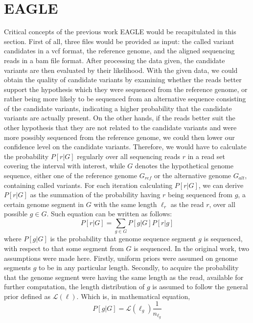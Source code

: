 \documentclass{PHlab-thesis}
\begin{document}
\section{EAGLE}
Critical concepts of the previous work EAGLE would be recapitulated in this section. First of all, three files would be provided as input: the called variant candidates in a vcf format, the reference genome, and the aligned sequencing reads in a bam file format. After processing the data given, the candidate variants are then evaluated by their likelihood. With the given data, we could obtain the quality of candidate variants by examining whether the reads better support the hypothesis which they were sequenced from the reference genome, or rather being more likely to be sequenced from an alternative sequence consisting of the candidate variants, indicating a higher probability that the candidate variants are actually present. On the other hands, if the reads better suit the other hypothesis that they are not related to the candidate variants and were more possibly sequenced from the reference genome, we could then lower our confidence level on the candidate variants. Therefore, we would have to calculate the probability $P[r|G]$ regularly over all sequencing reads $r$ in a read set covering the interval with interest, while $G$ denotes the hypothetical genome sequence, either one of the reference genome $G_{ref}$ or the alternative genome $G_{alt}$, containing called variants. For each iteration calculating $P[r|G]$, we can derive $P[r|G]$ as the summation of the probability having $r$ being sequenced from $g$, a certain genome segment in $G$ with the same length $\ell_r$ as the read $r$, over all possible ${g\in G}$. Such equation can be written as follows:
\begin{equation}
P[r|G] = \sum_{g\in G} P[g|G] P[r|g]
\end{equation}
where $P[g|G]$ is the probability that genome sequence segment $g$ is sequenced, with respect to that some segment from $G$ is sequenced. In the original work, two assumptions were made here. Firstly, uniform priors were assumed on genome segments $g$ to be in any particular length. Secondly, to acquire the probability that the genome segment were having the same length as the read, available for further computation, the length distribution of $g$ is assumed to follow the general prior defined as $\mathcal{L}(\ell)$. Which is, in mathematical equation,
\begin{equation}
P[g|G] = \mathcal{L}(\ell_g) \frac{1}{n_{\ell_g}}
\end{equation}
\end{document}
